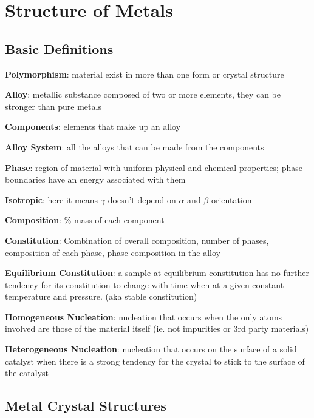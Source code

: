 \section{Structure of Metals}
\subsection{Basic Definitions}

\textbf{Polymorphism}: material exist in more than one form or crystal structure

\textbf{Alloy}: metallic substance composed of two or more elements, they can be stronger than pure metals

\textbf{Components}: elements that make up an alloy

\textbf{Alloy System}: all the alloys that can be made from the components

\textbf{Phase}: region of material with uniform physical and chemical properties; phase boundaries have an energy associated with them

\textbf{Isotropic}: here it means $\gamma$ doesn't depend on $\alpha$ and $\beta$ orientation

\textbf{Composition}: \% mass of each component

\textbf{Constitution}: Combination of overall composition, number of phases, composition of each phase, phase composition in the alloy

\textbf{Equilibrium Constitution}: a sample at equilibrium constitution has no further tendency for its constitution to change with time when at a given constant temperature and pressure. (aka stable constitution)

\textbf{Homogeneous Nucleation}: nucleation that occurs when the only atoms involved are those of the material itself (ie. not impurities or 3rd party materials)

\textbf{Heterogeneous Nucleation}: nucleation that occurs on the surface of a solid catalyst when there is a strong tendency for the crystal to stick to the surface of the catalyst


\subsection{Metal Crystal Structures} %
\label{sub:metal_crystal_structures}

